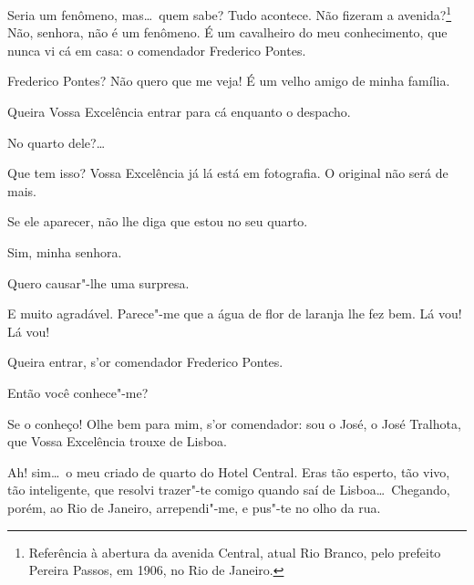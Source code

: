   Seria um fenômeno, mas\ldots\ quem sabe? Tudo acontece. Não
fizeram a avenida?\footnote{
Referência à abertura da avenida Central, atual Rio Branco, pelo prefeito Pereira Passos, em 1906, no Rio de Janeiro.} 
 Não,
senhora, não é um fenômeno.  É um cavalheiro do
meu conhecimento, que nunca vi cá em casa: o comendador Frederico
Pontes.

  Frederico Pontes? Não quero que me veja! É um velho
amigo de minha família.

 
Queira Vossa Excelência entrar para cá enquanto o despacho.

  No quarto
dele?\ldots

  Que tem isso? Vossa Excelência já lá
está em fotografia. O original não será de mais.

  Se ele aparecer, não lhe diga
que estou no seu quarto.

  Sim, minha senhora.

  Quero causar"-lhe uma surpresa.

  E muito agradável.  Parece"-me que a água de
flor de laranja lhe fez bem.  Lá
vou! Lá vou! 


   Queira entrar,
s'or comendador Frederico Pontes. 

  Então você conhece"-me?

  Se o conheço! Olhe bem para mim, s'or
comendador: sou o José, o José Tralhota, que Vossa Excelência trouxe de
Lisboa.

   Ah!
sim\ldots\ o meu criado de quarto do Hotel Central. Eras tão esperto, tão
vivo, tão inteligente, que resolvi trazer"-te comigo quando saí de
Lisboa\ldots\ Chegando, porém, ao Rio de Janeiro, arrependi"-me, e pus"-te no
olho da rua. 


